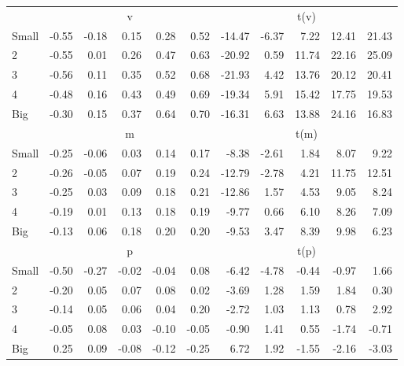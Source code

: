 \begin{table}[!ht]
\begin{tabular}{lrrrrrrrrrr}
  
     & \multicolumn{5}{c}{v} & \multicolumn{5}{c}{t(v)}   \\
     \cmidrule(r){2-6} \cmidrule(r){7-11} 
    Small  & -0.55  & -0.18  & 0.15  & 0.28  & 0.52  & -14.47  & -6.37  & 7.22  & 12.41  & 21.43   \\
    2  & -0.55  & 0.01  & 0.26  & 0.47  & 0.63  & -20.92  & 0.59  & 11.74  & 22.16  & 25.09   \\
    3  & -0.56  & 0.11  & 0.35  & 0.52  & 0.68  & -21.93  & 4.42  & 13.76  & 20.12  & 20.41   \\
    4  & -0.48  & 0.16  & 0.43  & 0.49  & 0.69  & -19.34  & 5.91  & 15.42  & 17.75  & 19.53   \\
    Big  & -0.30  & 0.15  & 0.37  & 0.64  & 0.70  & -16.31  & 6.63  & 13.88  & 24.16  & 16.83   \\
    
  
     & \multicolumn{5}{c}{m} & \multicolumn{5}{c}{t(m)}   \\
     \cmidrule(r){2-6} \cmidrule(r){7-11} 
    Small  & -0.25  & -0.06  & 0.03  & 0.14  & 0.17  & -8.38  & -2.61  & 1.84  & 8.07  & 9.22   \\
    2  & -0.26  & -0.05  & 0.07  & 0.19  & 0.24  & -12.79  & -2.78  & 4.21  & 11.75  & 12.51   \\
    3  & -0.25  & 0.03  & 0.09  & 0.18  & 0.21  & -12.86  & 1.57  & 4.53  & 9.05  & 8.24   \\
    4  & -0.19  & 0.01  & 0.13  & 0.18  & 0.19  & -9.77  & 0.66  & 6.10  & 8.26  & 7.09   \\
    Big  & -0.13  & 0.06  & 0.18  & 0.20  & 0.20  & -9.53  & 3.47  & 8.39  & 9.98  & 6.23   \\
    
  
     & \multicolumn{5}{c}{p} & \multicolumn{5}{c}{t(p)}   \\
     \cmidrule(r){2-6} \cmidrule(r){7-11} 
    Small  & -0.50  & -0.27  & -0.02  & -0.04  & 0.08  & -6.42  & -4.78  & -0.44  & -0.97  & 1.66   \\
    2  & -0.20  & 0.05  & 0.07  & 0.08  & 0.02  & -3.69  & 1.28  & 1.59  & 1.84  & 0.30   \\
    3  & -0.14  & 0.05  & 0.06  & 0.04  & 0.20  & -2.72  & 1.03  & 1.13  & 0.78  & 2.92   \\
    4  & -0.05  & 0.08  & 0.03  & -0.10  & -0.05  & -0.90  & 1.41  & 0.55  & -1.74  & -0.71   \\
    Big  & 0.25  & 0.09  & -0.08  & -0.12  & -0.25  & 6.72  & 1.92  & -1.55  & -2.16  & -3.03   \\
    
  
  \bottomrule
\end{tabular}
\label{tbl:25_Size_BM_B16}
\end{table}
